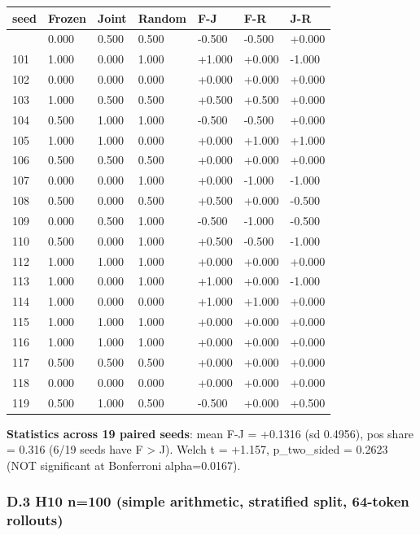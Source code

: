 \documentclass[
]{article}
\newcounter{none} %
\begin{document}
{\def\LTcaptype{none} %
\begin{longtable}[]{@{}lllllll@{}}
\toprule\noalign{}
seed & Frozen & Joint & Random & F-J & F-R & J-R \\
\midrule\noalign{}
\endhead
\bottomrule\noalign{}
\endlastfoot
100 & 0.000 & 0.500 & 0.500 & -0.500 & -0.500 & +0.000 \\
101 & 1.000 & 0.000 & 1.000 & +1.000 & +0.000 & -1.000 \\
102 & 0.000 & 0.000 & 0.000 & +0.000 & +0.000 & +0.000 \\
103 & 1.000 & 0.500 & 0.500 & +0.500 & +0.500 & +0.000 \\
104 & 0.500 & 1.000 & 1.000 & -0.500 & -0.500 & +0.000 \\
105 & 1.000 & 1.000 & 0.000 & +0.000 & +1.000 & +1.000 \\
106 & 0.500 & 0.500 & 0.500 & +0.000 & +0.000 & +0.000 \\
107 & 0.000 & 0.000 & 1.000 & +0.000 & -1.000 & -1.000 \\
108 & 0.500 & 0.000 & 0.500 & +0.500 & +0.000 & -0.500 \\
109 & 0.000 & 0.500 & 1.000 & -0.500 & -1.000 & -0.500 \\
110 & 0.500 & 0.000 & 1.000 & +0.500 & -0.500 & -1.000 \\
112 & 1.000 & 1.000 & 1.000 & +0.000 & +0.000 & +0.000 \\
113 & 1.000 & 0.000 & 1.000 & +1.000 & +0.000 & -1.000 \\
114 & 1.000 & 0.000 & 0.000 & +1.000 & +1.000 & +0.000 \\
115 & 1.000 & 1.000 & 1.000 & +0.000 & +0.000 & +0.000 \\
116 & 1.000 & 1.000 & 1.000 & +0.000 & +0.000 & +0.000 \\
117 & 0.500 & 0.500 & 0.500 & +0.000 & +0.000 & +0.000 \\
118 & 0.000 & 0.000 & 0.000 & +0.000 & +0.000 & +0.000 \\
119 & 0.500 & 1.000 & 0.500 & -0.500 & +0.000 & +0.500 \\
\end{longtable}
}

\textbf{Statistics across 19 paired seeds}: mean F-J = +0.1316 (sd
0.4956), pos share = 0.316 (6/19 seeds have F \textgreater{} J). Welch t
= +1.157, p\_two\_sided = 0.2623 (NOT significant at Bonferroni
alpha=0.0167).

\subsubsection{D.3 H10 n=100 (simple arithmetic, stratified split,
64-token
rollouts)}\label{d.3-h10-n100-simple-arithmetic-stratified-split-64-token-rollouts}
\end{document}
